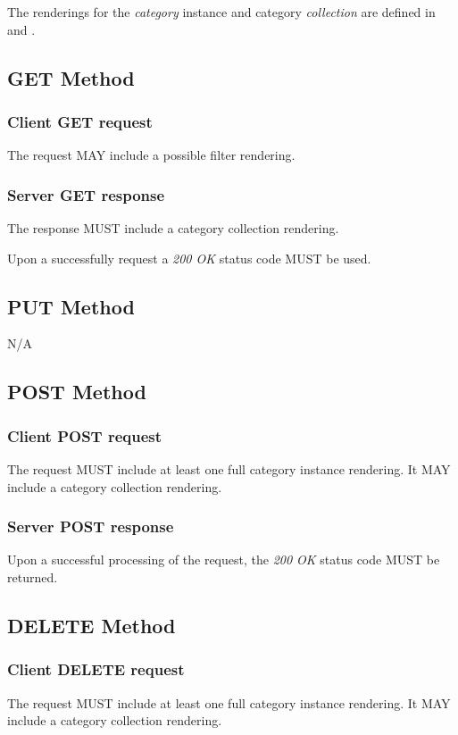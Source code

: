 \documentclass[10pt,a4paper]{article}
\begin{document}
The renderings for the {\em category} instance and category {\em collection} are defined in \cite{occi:text} and \cite{occi:json}.

\subsection{GET Method}

\subsubsection*{Client GET request}
The request MAY include a possible filter rendering.

\subsubsection*{Server GET response}
The response MUST include a category collection rendering.

Upon a successfully request a \emph{200 OK} status code MUST be used.

\subsection{PUT Method}

N/A

\subsection{POST Method}

\subsubsection*{Client POST request}
The request MUST include at least one full category instance rendering. It MAY include a category collection rendering.

\subsubsection*{Server POST response}
Upon a successful processing of the request, the \emph{200 OK} status code MUST be returned.

\subsection{DELETE Method}

\subsubsection*{Client DELETE request}
The request MUST include at least one full category instance rendering. It MAY include a category collection rendering.
\end{document}
